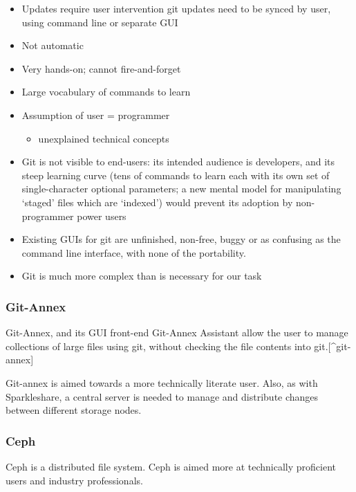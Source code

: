 \documentclass[12pt,a4paper,]{book}
\begin{document}
\begin{itemize}
\item
  Updates require user intervention git updates need to be synced by
  user, using command line or separate GUI
\item
  Not automatic
\item
  Very hands-on; cannot fire-and-forget
\item
  Large vocabulary of commands to learn
\item
  Assumption of user = programmer

  \begin{itemize}
  \itemsep1pt\parskip0pt
  \item
    unexplained technical concepts
  \end{itemize}
\item
  Git is not visible to end-users: its intended audience is developers,
  and its steep learning curve (tens of commands to learn each with its
  own set of single-character optional parameters; a new mental model
  for manipulating `staged' files which are `indexed') would prevent its
  adoption by non-programmer power users
\item
  Existing GUIs for git are unfinished, non-free, buggy or as confusing
  as the command line interface, with none of the portability.
\item
  Git is much more complex than is necessary for our task
\end{itemize}

\subsubsection{Git-Annex}\label{git-annex}

Git-Annex, and its GUI front-end Git-Annex Assistant allow the user to
manage collections of large files using git, without checking the file
contents into git.{[}\^{}git-annex{]}

Git-annex is aimed towards a more technically literate user. Also, as
with Sparkleshare, a central server is needed to manage and distribute
changes between different storage nodes.

\subsubsection{Ceph}\label{ceph}

Ceph is a distributed file system. Ceph is aimed more at technically
proficient users and industry professionals.
\end{document}
